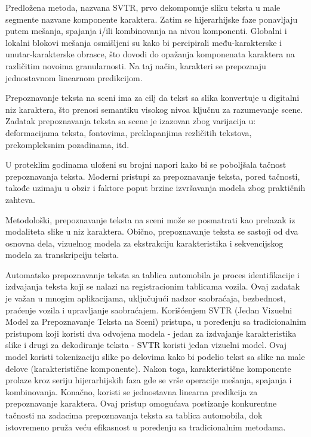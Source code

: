 \documentclass[a4paper,12pt]{article}
\begin{document}
	Predložena metoda, nazvana SVTR, prvo dekomponuje sliku teksta u male segmente nazvane komponente karaktera. Zatim se hijerarhijske faze ponavljaju putem mešanja, spajanja i/ili kombinovanja na nivou komponenti. Globalni i lokalni blokovi mešanja osmišljeni su kako bi percipirali među-karakterske i unutar-karakterske obrasce, što dovodi do opažanja komponenata karaktera na različitim novoima granularnosti. Na taj način, karakteri se prepoznaju jednostavnom linearnom predikcijom.
	
	Prepoznavanje teksta na sceni ima za cilj da tekst sa slika konvertuje u digitalni niz karaktera, što prenosi semantiku visokog nivoa ključnu za razumevanje scene. Zadatak prepoznavanja teksta sa scene je izazovan zbog varijacija u: deformacijama teksta, fontovima, preklapanjima rezličitih tekstova, prekompleksnim pozadinama, itd.
	
	U proteklim godinama uloženi su brojni napori kako bi se poboljšala tačnost prepoznavanja teksta. Moderni pristupi za prepoznavanje teksta, pored tačnosti, takođe uzimaju u obzir i faktore poput brzine izvršavanja modela zbog praktičnih zahteva.
	
	Metodološki, prepoznavanje teksta na sceni može se posmatrati kao prelazak iz modaliteta slike u niz karaktera. Obično, prepoznavanje teksta se sastoji od dva osnovna dela, vizuelnog modela za ekstrakciju karakteristika i sekvencijskog modela za transkripciju teksta.
	\par
	Automatsko prepoznavanje teksta sa tablica automobila je proces identifikacije i izdvajanja teksta koji se nalazi na registracionim tablicama vozila. Ovaj zadatak je važan u mnogim aplikacijama, uključujući nadzor saobraćaja, bezbednost, praćenje vozila i upravljanje saobraćajem. Korišćenjem SVTR (Jedan Vizuelni Model za Prepoznavanje Teksta na Sceni) pristupa, u poređenju sa tradicionalnim pristupom koji koristi dva odvojena modela - jedan za izdvajanje karakteristika slike i drugi za dekodiranje teksta - SVTR koristi jedan vizuelni model. Ovaj model koristi tokenizaciju slike po delovima kako bi podelio tekst sa slike na male delove (karakteristične komponente). Nakon toga, karakteristične komponente prolaze kroz seriju hijerarhijskih faza gde se vrše operacije mešanja, spajanja i kombinovanja. Konačno, koristi se jednostavna linearna predikcija za prepoznavanje karaktera. Ovaj pristup omogućava postizanje konkurentne tačnosti na zadacima prepoznavanja teksta sa tablica automobila, dok istovremeno pruža veću efikasnost u poređenju sa tradicionalnim metodama.
	
\end{document}
